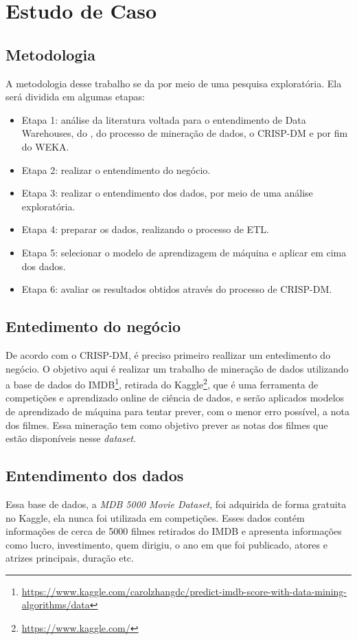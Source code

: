 \section{Estudo de Caso}

\subsection{Metodologia}
A metodologia desse trabalho se da por meio de uma pesquisa exploratória. Ela será dividida em algumas etapas:

\begin{itemize}
    \item Etapa 1: análise da literatura voltada para o entendimento de Data Warehouses, do \pdi, do processo de mineração de dados, o CRISP-DM e por fim do WEKA.
    \item Etapa 2: realizar o entendimento do negócio.
    \item Etapa 3: realizar o entendimento dos dados, por meio de uma análise exploratória.
    \item Etapa 4: preparar os dados, realizando o processo de ETL.
    \item Etapa 5: selecionar o modelo de aprendizagem de máquina e aplicar em cima dos dados.
    \item Etapa 6: avaliar os resultados obtidos através do processo de CRISP-DM.
\end{itemize}

\subsection{Entedimento do negócio}
De acordo com o CRISP-DM, é preciso primeiro reallizar um entedimento do negócio.
O objetivo aqui é realizar um trabalho de mineração de dados utilizando a base de dados do IMDB\footnote{\url{https://www.kaggle.com/carolzhangdc/predict-imdb-score-with-data-mining-algorithms/data}}, retirada do Kaggle\footnote{\url{https://www.kaggle.com/}}, que é uma ferramenta de competições e aprendizado online de ciência de dados, e serão aplicados modelos de aprendizado de máquina para tentar prever, com o menor erro possível, a nota dos filmes. Essa mineração tem como objetivo prever as notas dos filmes que estão disponíveis nesse \textit{dataset}. 

\subsection{Entendimento dos dados}
Essa base de dados, a \textit{MDB 5000 Movie Dataset}, foi adquirida de forma gratuita no Kaggle, ela nunca foi utilizada em competições. Esses dados contém informações de cerca de 5000 filmes retirados do IMDB e apresenta informações como lucro, investimento, quem dirigiu, o ano em que foi publicado, atores e atrizes principais, duração etc.

